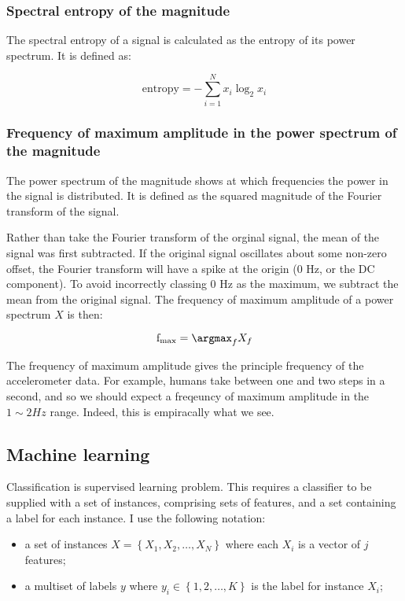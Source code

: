       \subsubsection{Spectral entropy of the magnitude}
        The spectral entropy of a signal is calculated as the entropy of its power spectrum. It is defined as:

        $$\mathrm{entropy} = -\sum\limits_{i=1}^N x_i \log_2 x_i$$
      \subsubsection{Frequency of maximum amplitude in the power spectrum of the magnitude}
        The power spectrum of the magnitude shows at which frequencies the power in the signal is distributed. It is defined as the squared magnitude of the Fourier transform of the signal.
        
        Rather than take the Fourier transform of the orginal signal, the mean of the signal was first subtracted. If the original signal oscillates about some non-zero offset, the Fourier transform will have a spike at the origin (0 \si{Hz}, or the DC component). To avoid incorrectly classing 0 \si{Hz} as the maximum, we subtract the mean from the original signal. The frequency of maximum amplitude of a power spectrum $X$ is then:
        
        $$\mathrm{f}_\mathrm{max} = \argmax_f X_f$$
        
        The frequency of maximum amplitude gives the principle frequency of the accelerometer data. For example, humans take between one and two steps in a second, and so we should expect a freqeuncy of maximum amplitude in the $1 \sim 2 \si{Hz}$ range. Indeed, this is empiracally what we see.
        
    \subsection{Machine learning}
      Classification is supervised learning problem. This requires a classifier to be supplied with a set of instances, comprising sets of features, and a set containing a label for each instance. I use the following notation:
      \begin{itemize}
        \item a set of instances $X = \left\{X_1, X_2, \dots, X_N\right\}$ where each $X_i$ is a vector of $j$ features;
        \item a multiset of labels $y$ where $y_i \in \left\{1, 2, \dots, K\right\}$ is the label for instance $X_i$;
      \end{itemize}  
      

